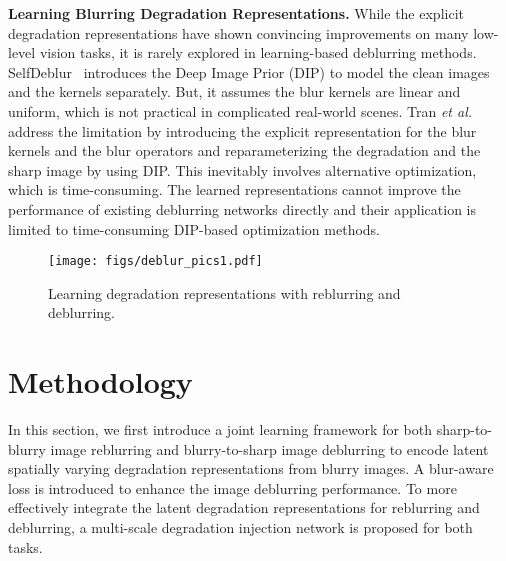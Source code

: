 \documentclass[runningheads]{llncs}
\def\etal{{\em et al.}}
\begin{document}
\noindent\textbf{Learning Blurring Degradation Representations.}
While the explicit degradation representations have shown convincing improvements on many low-level vision tasks, it is rarely explored in learning-based deblurring methods. SelfDeblur~\cite{Blind_DIP} introduces the Deep Image Prior (DIP) \cite{DIP_2018_CVPR} to model the clean images and the kernels separately. But, it assumes the blur kernels are linear and uniform, which is not practical in complicated real-world scenes. Tran \etal~\cite{Exploring_blur-CVPR21} address the limitation by introducing the explicit representation for the blur kernels and the blur operators and reparameterizing the degradation and the sharp image by using DIP. This inevitably involves alternative optimization, which is time-consuming.   
The learned representations cannot improve the performance of existing deblurring networks directly and their application is limited to time-consuming DIP-based optimization methods.

\begin{figure*}[t]
  \centering
   \texttt{[image: figs/deblur\_pics1.pdf]}
   \caption{Learning degradation representations with reblurring and deblurring.}
   \label{fig:overview}
\end{figure*}

\section{Methodology}

In this section, we first introduce a joint learning framework for both sharp-to-blurry image reblurring and blurry-to-sharp image deblurring to encode latent spatially varying degradation representations from blurry images. A blur-aware loss is introduced to enhance the image deblurring performance.
To more effectively integrate the latent degradation representations for reblurring and deblurring, a multi-scale degradation injection network is proposed for both tasks.
\end{document}
